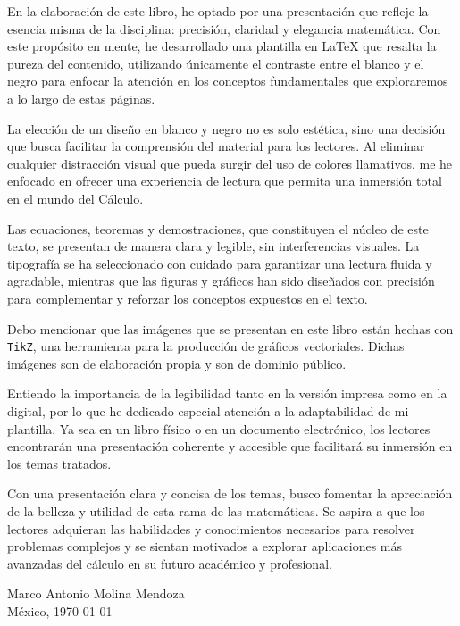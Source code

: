 En la elaboración de este libro, he optado por una presentación que refleje la esencia misma de la disciplina: precisión, claridad y elegancia matemática. Con este propósito en mente, he desarrollado una plantilla en LaTeX que resalta la pureza del contenido, utilizando únicamente el contraste entre el blanco y el negro para enfocar la atención en los conceptos fundamentales que exploraremos a lo largo de estas páginas.

La elección de un diseño en blanco y negro no es solo estética, sino una decisión que busca facilitar la comprensión del material para los lectores. Al eliminar cualquier distracción visual que pueda surgir del uso de colores llamativos, me he enfocado en ofrecer una experiencia de lectura que permita una inmersión total en el mundo del Cálculo.

Las ecuaciones, teoremas y demostraciones, que constituyen el núcleo de este texto, se presentan de manera clara y legible, sin interferencias visuales. La tipografía se ha seleccionado con cuidado para garantizar una lectura fluida y agradable, mientras que las figuras y gráficos han sido diseñados con precisión para complementar y reforzar los conceptos expuestos en el texto.

Debo mencionar que las imágenes que se presentan en este libro están hechas con \texttt{TikZ}, una herramienta para la producción de gráficos vectoriales. Dichas imágenes son de elaboración propia y son de dominio público.

Entiendo la importancia de la legibilidad tanto en la versión impresa como en la digital, por lo que he dedicado especial atención a la adaptabilidad de mi plantilla. Ya sea en un libro físico o en un documento electrónico, los lectores encontrarán una presentación coherente y accesible que facilitará su inmersión en los temas tratados.

Con una presentación clara y concisa de los temas, busco fomentar la apreciación de la belleza y utilidad de esta rama de las matemáticas. Se aspira a que los lectores adquieran las habilidades y conocimientos necesarios para resolver problemas complejos y se sientan motivados a explorar aplicaciones más avanzadas del cálculo en su futuro académico y profesional.\vfill

\begin{flushright}
    Marco Antonio Molina Mendoza\\ 
    México, \today\\ 
\end{flushright}